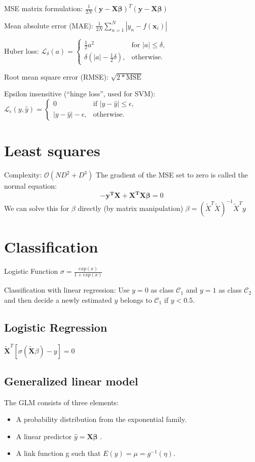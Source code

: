 \documentclass[10pt,a4paper,landscape]{article}
\providecommand{\bf}[1]{\ensuremath{\mathbf{#1}}}
\begin{document}
\begin{multicols*}{4}
MSE matrix formulation: $\frac{1}{2N} (\bf{y - X \beta})^T (\bf{y - X \beta})$

Mean absolute error (MAE): $\frac{1}{2N} \sum_{n=1}^{N}\left | y_n-f(\bf{x}_i) \right |$

Huber loss: $\mathcal{L}_\delta (a) = \begin{cases}
\frac{1}{2}{a^2}                   & \text{for } |a| \le \delta, \\
\delta (|a| - \frac{1}{2}\delta ), & \text{otherwise.}
\end{cases}$

Root mean square error (RMSE): $\sqrt{2 * \text{MSE}}$

Epsilon insensitive (``hinge loss'', used for SVM):
$\mathcal{L}_{\epsilon}(y, \hat{y}) = \begin{cases}
0                   & \text{if } |y - \hat y| \le \epsilon, \\
|y - \hat y| - \epsilon, & \text{otherwise.}
\end{cases}$

\section{Least squares}
Complexity: $\mathcal{O}(ND^2 + D^3)$
The gradient of the MSE set to zero is called the normal equation:
$$ - \bf{y^T X} + \bf{X^T X \beta} = 0$$
We can solve this for $\beta$ directly (by matrix manipulation)
$\beta = ( \tilde{X}^T \tilde{X} )^{-1} \tilde{X}^T y$

\section{Classification}
Logistic Function $\sigma = \frac{exp(x)}{1+exp(x)}$

Classification with linear regression: Use $y = 0$ as class $\mathcal{C_1}$
and $y = 1$ as class $\mathcal{C_2}$ and then decide a newly estimated $y$ belongs
to $\mathcal{C_1}$ if $y < 0.5$.

\subsection{Logistic Regression}
$\tilde{\bf{X}}^T [\sigma(\tilde{\bf{X}} \beta) - y] = 0$

\subsection{Generalized linear model}
The GLM consists of three elements:
\begin{itemize}
	\item A probability distribution from the exponential family.
    \item A linear predictor $\hat y = \bf{X} \bf{\beta}$ .
    \item A link function g such that $E(y) = μ = g^{-1}(η)$.
\end{itemize}


\end{multicols*}
\end{document}
